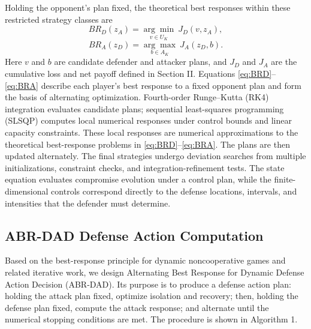 \documentclass[conference,letterpaper]{IEEEtran}
\begin{document}
Holding the opponent's plan fixed, the theoretical best responses within these restricted strategy classes are
\begin{equation}\label{eq:BRD}
BR_D(z_A)=\underset{v\in U_K}{\arg\min}\ J_D(v,z_A),
\end{equation}
\begin{equation}\label{eq:BRA}
BR_A(z_D)=\underset{b\in A_K}{\arg\max}\ J_A(z_D,b).
\end{equation}
Here $v$ and $b$ are candidate defender and attacker plans, and $J_D$ and $J_A$ are the cumulative loss and net payoff defined in Section II. Equations \eqref{eq:BRD}--\eqref{eq:BRA} describe each player's best response to a fixed opponent plan and form the basis of alternating optimization. Fourth-order Runge--Kutta (RK4) integration\cite{r19} evaluates candidate plans; sequential least-squares programming (SLSQP) computes local numerical responses under control bounds and linear capacity constraints\cite{r20,r21}. These local responses are numerical approximations to the theoretical best-response problems in \eqref{eq:BRD}--\eqref{eq:BRA}. The plans are then updated alternately. The final strategies undergo deviation searches from multiple initializations, constraint checks, and integration-refinement tests. The state equation evaluates compromise evolution under a control plan, while the finite-dimensional controls correspond directly to the defense locations, intervals, and intensities that the defender must determine.

\subsection{ABR-DAD Defense Action Computation}
Based on the best-response principle for dynamic noncooperative games\cite{r17} and related iterative work\cite{r22}, we design Alternating Best Response for Dynamic Defense Action Decision (ABR-DAD). Its purpose is to produce a defense action plan: holding the attack plan fixed, optimize isolation and recovery; then, holding the defense plan fixed, compute the attack response; and alternate until the numerical stopping conditions are met. The procedure is shown in Algorithm 1.
\end{document}

